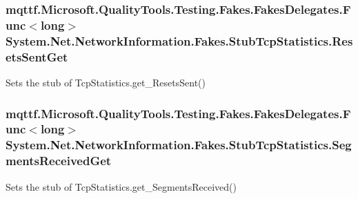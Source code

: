 \hypertarget{class_system_1_1_net_1_1_network_information_1_1_fakes_1_1_stub_tcp_statistics_a9aa8442e959bf5c84a1bb37437f515ac}{
\subsubsection[{Resets\-Sent\-Get}]{\setlength{\rightskip}{0pt plus 5cm}mqttf.\-Microsoft.\-Quality\-Tools.\-Testing.\-Fakes.\-Fakes\-Delegates.\-Func$<$long$>$ System.\-Net.\-Network\-Information.\-Fakes.\-Stub\-Tcp\-Statistics.\-Resets\-Sent\-Get}}\label{class_system_1_1_net_1_1_network_information_1_1_fakes_1_1_stub_tcp_statistics_a9aa8442e959bf5c84a1bb37437f515ac}


Sets the stub of Tcp\-Statistics.\-get\-\_\-\-Resets\-Sent()

\hypertarget{class_system_1_1_net_1_1_network_information_1_1_fakes_1_1_stub_tcp_statistics_a5a8baeab4bf48143550c04187aa2dd78}{
\subsubsection[{Segments\-Received\-Get}]{\setlength{\rightskip}{0pt plus 5cm}mqttf.\-Microsoft.\-Quality\-Tools.\-Testing.\-Fakes.\-Fakes\-Delegates.\-Func$<$long$>$ System.\-Net.\-Network\-Information.\-Fakes.\-Stub\-Tcp\-Statistics.\-Segments\-Received\-Get}}\label{class_system_1_1_net_1_1_network_information_1_1_fakes_1_1_stub_tcp_statistics_a5a8baeab4bf48143550c04187aa2dd78}


Sets the stub of Tcp\-Statistics.\-get\-\_\-\-Segments\-Received()

